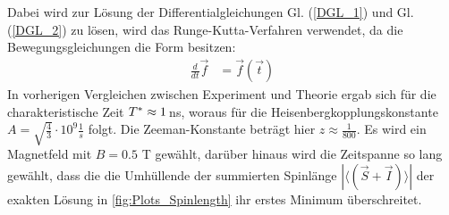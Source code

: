 Dabei wird zur Lösung der Differentialgleichungen Gl. (\ref{DGL_1}) und Gl. (\ref{DGL_2}) zu lösen, wird das Runge-Kutta-Verfahren verwendet, da die 
Bewegungsgleichungen die Form besitzen:
\begin{align}
    \frac{d}{dt}\vec{f} &= \vec{f}(\vec{t}) 
\end{align}
In vorherigen Vergleichen zwischen Experiment und Theorie ergab sich für die charakteristische Zeit $T^*\approx 1 \thinspace$ns\cite{PhysRevB.89.045317}, 
woraus für die Heisenbergkopplungskonstante $A = \sqrt{\frac{4}{3}}\cdot 10^9 \frac{1}{s}$ folgt. Die Zeeman-Konstante beträgt hier 
$z\approx\frac{1}{800}$. Es wird ein Magnetfeld mit $B = 0.5$ T gewählt, darüber hinaus wird die Zeitspanne so lang gewählt, dass die die Umhüllende der 
summierten Spinlänge $|\langle \left( \vec{S}+\vec{I} \right)\rangle |$  der exakten Lösung in \autoref{fig:Plots_Spinlength} ihr erstes Minimum 
überschreitet.
